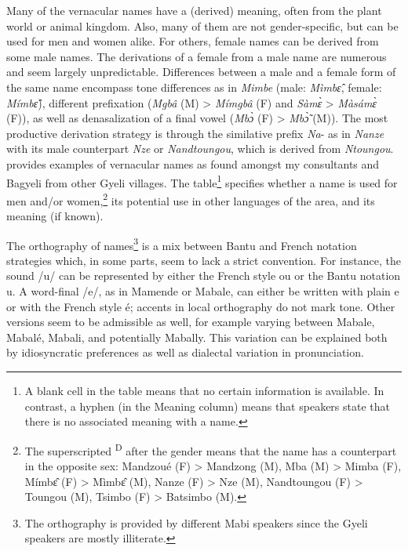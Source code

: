 Many of the vernacular names have a (derived) meaning, often from the plant world or animal kingdom. Also, many of them are not gender-specific, but can be used for men and women alike. For others, female names can be derived from some male names. The derivations of a female from a male name are numerous and seem largely unpredictable. Differences between a male and a female form of the same name encompass tone differences as in {\itshape Mimbe} (male: {\itshape Mìmbɛ̂}, female: {\itshape Mímbɛ̂}), different prefixation ({\itshape Mgbâ} (M) > {\itshape Mímgbâ} (F) and {\itshape Sàmɛ̀} > {\itshape Màsámɛ̀} (F)), as well as denasalization of a final vowel ({\itshape Mbɔ̀} (F) > {\itshape Mbɔ̃̀} (M)). The most productive derivation strategy is through the similative prefix {\itshape Na}- as in {\itshape Nanze} with its male counterpart {\itshape Nze} or {\itshape Nandtoungou}, which is derived from {\itshape Ntoungou}.
 provides examples of vernacular names as found amongst my consultants and Bagyeli from other Gyeli villages. The table\footnote{A blank cell in the table means that no certain information is available. In contrast, a hyphen (in the Meaning column) means that speakers state that there is no associated meaning with a name.} specifies whether a name is used for men and/or women,\footnote{The superscripted \textsuperscript{D} after the gender means that the name has a counterpart in the opposite sex: Mandzoué (F) > Mandzong (M), Mba (M) >  Mimba (F),  Mímbɛ̂ (F) > Mìmbɛ̂ (M), Nanze (F) > Nze (M), Nandtoungou (F) > Toungou (M), Tsimbo (F) > Batsimbo (M).} its potential use in other languages of the area, and its meaning (if known).

The orthography of names\footnote{The orthography is provided by different Mabi speakers since the Gyeli speakers are mostly illiterate.} is a mix between Bantu and French notation strategies which, in some parts, seem to lack a strict convention. For instance, the sound /u/ can be represented by either the French style {\textlangle}ou{\textrangle}  or the Bantu notation {\textlangle}u{\textrangle}. A word-final /e/, as in {\textlangle}Mamende{\textrangle} or {\textlangle}Mabale{\textrangle}, can either be written with plain {\textlangle}e{\textrangle} or with the French style {\textlangle}é{\textrangle}; accents in local orthography do not mark tone. Other versions seem to be admissible as well, for example varying between {\textlangle}Mabale{\textrangle}, {\textlangle}Mabalé{\textrangle}, {\textlangle}Mabali{\textrangle}, and potentially {\textlangle}Mabally{\textrangle}. This variation can be explained both by idiosyncratic preferences as well as dialectal variation in pronunciation.

